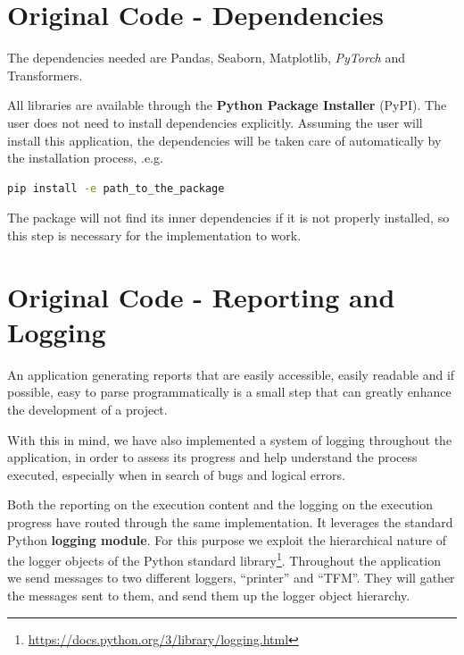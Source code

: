 \documentclass[a4paper, 11pt]{report}
\begin{document}
   \section{Original Code - Dependencies}
   The dependencies needed are Pandas, Seaborn, Matplotlib, \textit{PyTorch} and Transformers.

   All libraries are available through the \textbf{Python Package Installer} (PyPI). The user does not need to install dependencies explicitly. Assuming the user will install this application, the dependencies will be taken care of automatically by the installation process, .e.g.

   \begin{lstlisting}[language=bash]
   pip install -e path_to_the_package
   \end{lstlisting}

   The package will not find its inner dependencies if it is not properly installed, so this step is necessary for the implementation to work.

    \section{Original Code - Reporting and Logging}
   An application generating reports that are easily accessible, easily readable and if possible, easy to parse programmatically is a small step that can greatly enhance the development of a project.

   With this in mind, we have also implemented a system of logging throughout the application, in order to assess its progress and help understand the process executed, especially when in search of bugs and logical errors.

   Both the reporting on the execution content and the logging on the execution progress have routed through the same implementation. It leverages the standard Python \textbf{logging module}. For this purpose we exploit the hierarchical nature of the logger objects of the Python standard library\footnote{\url{https://docs.python.org/3/library/logging.html}}. Throughout the application we send messages to two different loggers, ``printer'' and ``TFM''. They will gather the messages sent to them, and send them up the logger object hierarchy.
\end{document}
